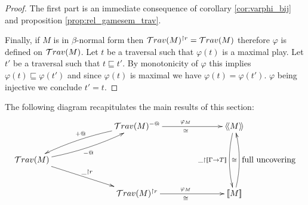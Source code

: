\begin{proof}
The first part is an immediate consequence of corollary
\ref{cor:varphi_bij} and proposition
\ref{prop:rel_gamesem_trav}.

Finally, if $M$ is in $\beta$-normal form then
$\mathcal{T}rav(M)^{\upharpoonright r} = \mathcal{T}rav(M)$
therefore $\varphi$ is defined on $\mathcal{T}rav(M)$. Let $t$ be a traversal such that $\varphi(t)$ is a maximal play. Let $t'$ be a traversal such that $t \sqsubseteq t'$. By monotonicity of $\varphi$ this implies $\varphi(t) \sqsubseteq \varphi(t')$ and since $\varphi(t)$ is maximal we have $\varphi(t) = \varphi(t')$. $\varphi$ being injective we conclude $t'=t$.
\end{proof}

The following diagram recapitulates the main results of this section:
$$
\xymatrix @C=6pc{
                                           & \travset(M)^{-@} \ar@/_/[dl]_{+@}  \ar[r]^{\varphi_M}_\cong & \intersem{M} \ar@/_/[dd]_{\_ \upharpoonright \sem{\Gamma\rightarrow T}} \\
\travset(M) \ar@/_/[ur]_{-@}^{} \ar[dr]^{\_ \upharpoonright r}  \\
                                           & \travset(M)^{\upharpoonright r} \ar[r]^{\varphi_M}_\cong & \sem{M} \ar@/_/[uu]^{\cong}_{\mbox{full uncovering}}
}
$$
